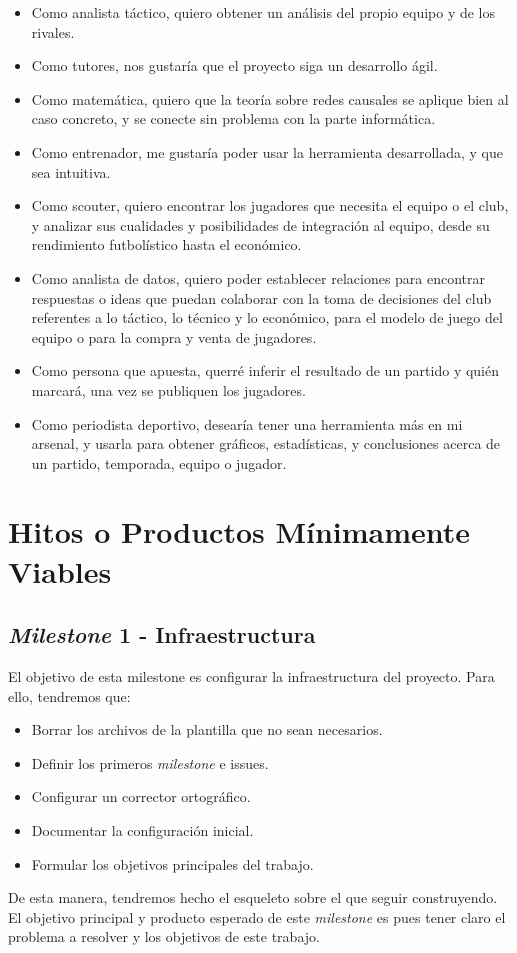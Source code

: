 \begin{itemize}
    \item Como analista táctico, quiero obtener un análisis del propio equipo y de los rivales.
    \item Como tutores, nos gustaría que el proyecto siga un desarrollo ágil.
    \item Como matemática, quiero que la teoría sobre redes causales se aplique bien al caso concreto, y se conecte sin problema con la parte informática.
    \item Como entrenador, me gustaría poder usar la herramienta desarrollada, y que sea intuitiva.
    \item Como scouter,  quiero encontrar los jugadores que necesita el equipo 
    o el club, y analizar sus cualidades y posibilidades de integración al equipo, desde su rendimiento futbolístico hasta el 
    económico.
    \item Como analista de datos, quiero poder establecer relaciones para encontrar respuestas o ideas que 
    puedan colaborar con la toma de decisiones del club referentes 
    a lo táctico, lo técnico y lo económico, para el modelo de 
    juego del equipo o para la compra y venta de jugadores. 
    \item Como persona que apuesta, querré inferir el resultado de un partido y 
    quién marcará, una vez se publiquen los jugadores. 
    \item Como periodista deportivo, desearía tener una herramienta más en mi arsenal, y 
    usarla para obtener gráficos, estadísticas, y conclusiones acerca de un partido, 
    temporada, equipo o jugador.
\end{itemize}

\section{Hitos o Productos Mínimamente Viables}

\subsection{\textit{Milestone} 1 - Infraestructura}
El objetivo de esta milestone es configurar la infraestructura del proyecto. Para ello, tendremos que:
\begin{itemize}
    \item Borrar los archivos de la plantilla que no sean necesarios.
    \item Definir los primeros \textit{milestone} e issues.
    \item Configurar un corrector ortográfico.
    \item Documentar la configuración inicial.
    \item Formular los objetivos principales del trabajo.
\end{itemize} 
De esta manera, tendremos hecho el esqueleto sobre el que seguir construyendo. El objetivo principal y 
producto esperado de este \textit{milestone} es pues tener claro el problema a resolver y los objetivos 
de este trabajo.
   
